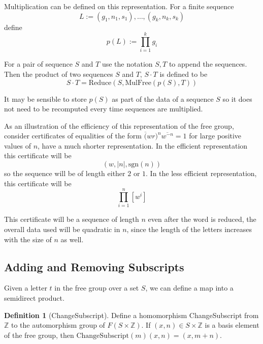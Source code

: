 \documentclass[12pt]{article} %
\theoremstyle{definition}
\theoremstyle{definition}
\theoremstyle{definition}
\theoremstyle{definition}
\theoremstyle{definition}
\newtheorem{defn}[theorem]{Definition}
\theoremstyle{definition}
\begin{document}

Multiplication can be defined on this representation.
For a finite sequence
\begin{equation}
  L := (g_1, n_1, s_1), \dots, (g_k, n_k, s_k)
\end{equation}
define
\begin{equation}
  p(L) := \prod_{i=1}^k g_i
\end{equation}

For a pair of sequence $S$ and $T$ use the notation $S,T$ to append the sequences.
Then the product of two sequences $S$ and $T$, $S\cdot T$ is defined to be
\begin{equation}
  S \cdot T = \text{Reduce}(S, \text{MulFree}(p(S), T))
\end{equation}

It may be sensible to store $p(S)$ as part of the data of a sequence $S$ so it does not
need to be recomputed every time sequences are multiplied.

As an illustration of the efficiency of this
representation of the free group, consider certificates of equalities
of the form $\overline(wr)^n \overline{w^{-n}} = 1$ for
large positive values of $n$,
have a much shorter representation.
In the efficient representation this certificate will
be
\begin{equation}
  (w, |n|, \text{sgn}(n))
\end{equation}
so the sequence
will be of length either $2$ or $1$. In the less efficient representation,
this certificate will be
\begin{equation}
  \prod_{i=1}^n [w^i]
\end{equation}

This certificate will be a sequence of length $n$ even after the word is reduced,
the overall data used will be quadratic in $n$, since the length of the letters
increases with the size of $n$ as well.

\subsection{Adding and Removing Subscripts}

Given a letter $t$ in the free group over a set $S$, we can define a map into a
semidirect product.

\begin{defn}[ChangeSubscript]\label{csub}
  Define a homomorphism ChangeSubscript from $\mathbb{Z}$ to the automorphism
  group of $F(S \times \mathbb{Z})$. If $(x, n) \in S \times \mathbb{Z}$ is a basis
  element of the free group, then $\text{ChangeSubscript}(m)(x, n) = (x, m + n)$.
\end{defn}
\end{document}
